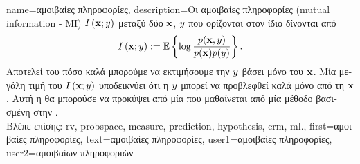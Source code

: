 {name={\foreignlanguage{greek}{αμοιβαίες πληροφορίες}},
	description={\foreignlanguage{greek}{Οι} 
		\foreignlanguage{greek}{αμοιβαίες πληροφορίες} (mutual information - MI) $I \left( {\bf x};y\right)$ 
 		\foreignlanguage{greek}{μεταξύ δύο}  ${\bf x}$, $y$ \foreignlanguage{greek}{που ορίζονται στον ίδιο} 
		 \foreignlanguage{greek}{δίνονται από} \cite{coverthomas} $$I \left( {\bf x};y\right) := 
		\mathbb{E} \left\{ \log \frac{p ({\bf x},y)}{p({\bf x})p(y)} \right\}.$$ 
		\foreignlanguage{greek}{Αποτελεί}  \foreignlanguage{greek}{του πόσο καλά μπορούμε να εκτιμήσουμε την} 
		$y$ \foreignlanguage{greek}{βάσει μόνο του} ${\bf x}$. \foreignlanguage{greek}{Μία μεγάλη τιμή του} 
		$I \left( {\bf x};y\right)$ \foreignlanguage{greek}{υποδεικνύει ότι η} $y$ \foreignlanguage{greek}{μπο\-ρεί 
		να προβλεφθεί καλά μόνο από τη} ${\bf x}$. \foreignlanguage{greek}{Αυτή η}  \foreignlanguage{greek}{θα 
		μπορούσε να προκύψει από μία}  \foreignlanguage{greek}{που μαθαίνεται από μία μέθοδο}  
		\foreignlanguage{greek}{βασισμένη στην} .
		\\
		\foreignlanguage{greek}{Βλέπε επίσης:} \gls{rv}, \gls{probspace}, \gls{measure}, \gls{prediction}, \gls{hypothesis}, \gls{erm}, \gls{ml}.}, 
	first={\foreignlanguage{greek}{αμοιβαίες πληροφορίες}}, 
	text={\foreignlanguage{greek}{αμοιβαίες πληροφορίες}},
	user1={\foreignlanguage{greek}{αμοιβαίες πληροφορίες}}, %
	user2={\foreignlanguage{greek}{αμοιβαίων πληροφοριών}} %
}
        
